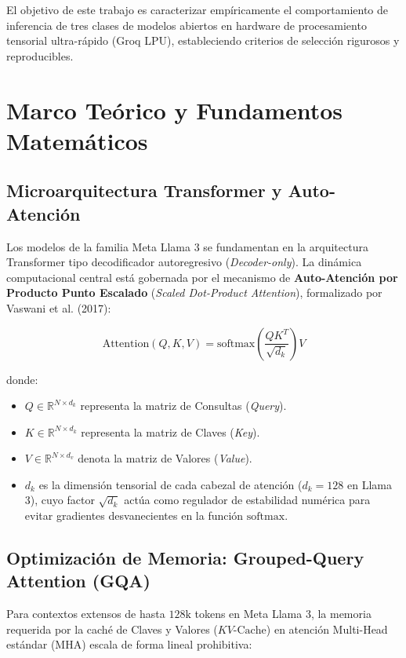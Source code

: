 \documentclass[12pt,letterpaper]{article}
\begin{document}
El objetivo de este trabajo es caracterizar empíricamente el comportamiento de inferencia de tres clases de modelos abiertos en hardware de procesamiento tensorial ultra-rápido (Groq LPU), estableciendo criterios de selección rigurosos y reproducibles.

\section{Marco Teórico y Fundamentos Matemáticos}

\subsection{Microarquitectura Transformer y Auto-Atención}
Los modelos de la familia Meta Llama 3 se fundamentan en la arquitectura Transformer tipo decodificador autoregresivo (\textit{Decoder-only}). La dinámica computacional central está gobernada por el mecanismo de \textbf{Auto-Atención por Producto Punto Escalado} (\textit{Scaled Dot-Product Attention}), formalizado por Vaswani et al. (2017):

\begin{equation}
\text{Attention}(Q, K, V) = \text{softmax}\left(\frac{Q K^T}{\sqrt{d_k}}\right) V
\end{equation}

\noindent donde:
\begin{itemize}
    \item $Q \in \mathbb{R}^{N \times d_k}$ representa la matriz de Consultas (\textit{Query}).
    \item $K \in \mathbb{R}^{N \times d_k}$ representa la matriz de Claves (\textit{Key}).
    \item $V \in \mathbb{R}^{N \times d_v}$ denota la matriz de Valores (\textit{Value}).
    \item $d_k$ es la dimensión tensorial de cada cabezal de atención ($d_k = 128$ en Llama 3), cuyo factor $\sqrt{d_k}$ actúa como regulador de estabilidad numérica para evitar gradientes desvanecientes en la función $\text{softmax}$.
\end{itemize}

\subsection{Optimización de Memoria: Grouped-Query Attention (GQA)}
Para contextos extensos de hasta $128\text{k}$ tokens en Meta Llama 3, la memoria requerida por la caché de Claves y Valores ($KV\text{-Cache}$) en atención Multi-Head estándar (MHA) escala de forma lineal prohibitiva:
\end{document}
